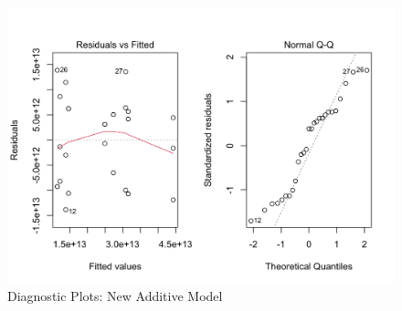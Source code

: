 \documentclass[11pt,a4paper]{article}
\begin{document}
\begin{figure}[htb]
    \centering
    \includegraphics[scale=0.3]{DP2}
    \caption{Diagnostic Plots: New Additive Model}
    \label{}
\end{figure}
\end{document}

